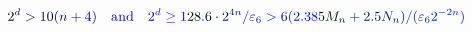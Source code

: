 \documentclass[12pt]{article}
\begin{document}
\makeatletter
\renewcommand*{\@textcolor}[3]{%
  \protect\leavevmode
  \begingroup
    \color#1{#2}#3%
  \endgroup
}
\makeatother
\begin{displaymath}
\mathcolor[RGB]{0,0,15}{2} ^ { \mathcolor[RGB]{0,0,30}{d} } \mathcolor[RGB]{0,0,45}{>} \mathcolor[RGB]{0,0,60}{1} \mathcolor[RGB]{0,0,75}{0} \mathcolor[RGB]{0,0,90}{(} \mathcolor[RGB]{0,0,105}{n} \mathcolor[RGB]{0,0,120}{+} \mathcolor[RGB]{0,0,135}{4} \mathcolor[RGB]{0,0,150}{)} \quad \mathrm { \mathcolor[RGB]{0,0,165}{a} \mathcolor[RGB]{0,0,180}{n} \mathcolor[RGB]{0,0,195}{d} } \quad \mathcolor[RGB]{0,0,210}{2} ^ { \mathcolor[RGB]{0,0,225}{d} } \mathcolor[RGB]{0,0,240}{\ge} \mathcolor[RGB]{0,0,255}{1} \mathcolor[RGB]{0,15,0}{2} \mathcolor[RGB]{0,15,15}{8} \mathcolor[RGB]{0,15,30}{.} \mathcolor[RGB]{0,15,45}{6} \mathcolor[RGB]{0,15,60}{\cdot} \mathcolor[RGB]{0,15,75}{2} ^ { \mathcolor[RGB]{0,15,90}{4} \mathcolor[RGB]{0,15,105}{n} } \mathcolor[RGB]{0,15,120}{/} \mathcolor[RGB]{0,15,135}{\varepsilon} _ { \mathcolor[RGB]{0,15,150}{6} } \mathcolor[RGB]{0,15,165}{>} \mathcolor[RGB]{0,15,180}{6} \mathcolor[RGB]{0,15,195}{(} \mathcolor[RGB]{0,15,210}{2} \mathcolor[RGB]{0,15,225}{.} \mathcolor[RGB]{0,15,240}{3} \mathcolor[RGB]{0,15,255}{8} \mathcolor[RGB]{0,30,0}{5} \mathcolor[RGB]{0,30,15}{M} _ { \mathcolor[RGB]{0,30,30}{n} } \mathcolor[RGB]{0,30,45}{+} \mathcolor[RGB]{0,30,60}{2} \mathcolor[RGB]{0,30,75}{.} \mathcolor[RGB]{0,30,90}{5
N} _ { \mathcolor[RGB]{0,30,105}{n} } \mathcolor[RGB]{0,30,120}{)} \mathcolor[RGB]{0,30,135}{/} \mathcolor[RGB]{0,30,150}{(} \mathcolor[RGB]{0,30,165}{\varepsilon} _ { \mathcolor[RGB]{0,30,180}{6} } \mathcolor[RGB]{0,30,195}{2} ^ { \mathcolor[RGB]{0,30,210}{-} \mathcolor[RGB]{0,30,225}{2} \mathcolor[RGB]{0,30,240}{n} } \mathcolor[RGB]{0,30,255}{)}
\end{displaymath}
\end{document}
